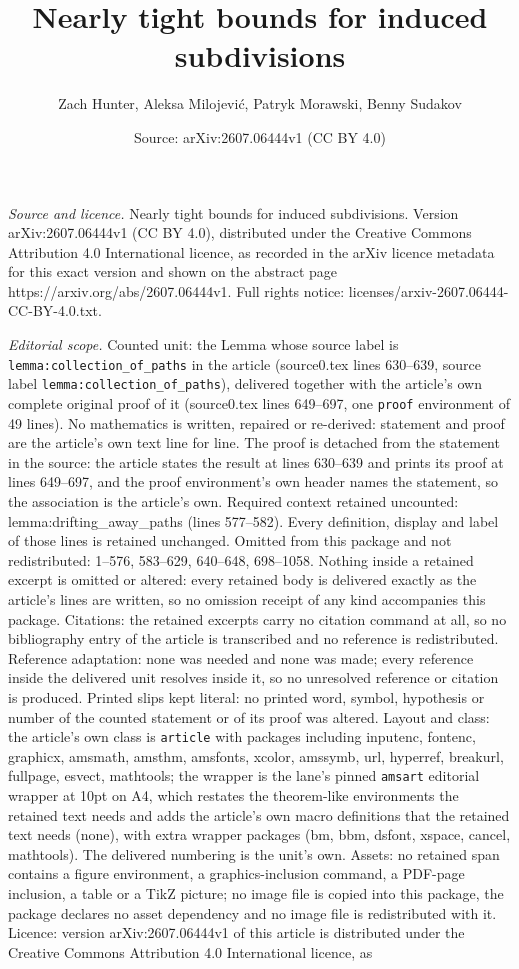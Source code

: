 \documentclass[10pt,a4paper]{amsart}
\title[Nearly tight bounds for induced subdivisions]{Nearly tight bounds for induced subdivisions}
\author{Zach Hunter, Aleksa Milojevi\'c, Patryk Morawski, Benny Sudakov}
\date{Source: arXiv:2607.06444v1 (CC BY 4.0)}
\begin{document}
\maketitle

\noindent\emph{Source and licence.} Nearly tight bounds for induced subdivisions. Version arXiv:2607.06444v1 (CC BY 4.0), distributed under the Creative Commons Attribution 4.0 International licence, as recorded in the arXiv licence metadata for this exact version and shown on the abstract page https://arxiv.org/abs/2607.06444v1. Full rights notice: licenses/arxiv-2607.06444-CC-BY-4.0.txt.\par\smallskip

\noindent\textit{Editorial scope.} Counted unit: the Lemma whose source label is \texttt{lemma:collection\_of\_paths} in the article (source0.tex lines 630--639, source label \texttt{lemma:collection\_of\_paths}), delivered together with the article's own complete original proof of it (source0.tex lines 649--697, one \texttt{proof} environment of 49 lines). No mathematics is written, repaired or re-derived: statement and proof are the article's own text line for line. The proof is detached from the statement in the source: the article states the result at lines 630--639 and prints its proof at lines 649--697, and the proof environment's own header names the statement, so the association is the article's own. Required context retained uncounted: lemma:drifting\_away\_paths (lines 577--582). Every definition, display and label of those lines is retained unchanged. Omitted from this package and not redistributed: 1--576, 583--629, 640--648, 698--1058. Nothing inside a retained excerpt is omitted or altered: every retained body is delivered exactly as the article's lines are written, so no omission receipt of any kind accompanies this package. Citations: the retained excerpts carry no citation command at all, so no bibliography entry of the article is transcribed and no reference is redistributed. Reference adaptation: none was needed and none was made; every reference inside the delivered unit resolves inside it, so no unresolved reference or citation is produced. Printed slips kept literal: no printed word, symbol, hypothesis or number of the counted statement or of its proof was altered. Layout and class: the article's own class is \texttt{article} with packages including inputenc, fontenc, graphicx, amsmath, amsthm, amsfonts, xcolor, amssymb, url, hyperref, breakurl, fullpage, esvect, mathtools; the wrapper is the lane's pinned \texttt{amsart} editorial wrapper at 10pt on A4, which restates the theorem-like environments the retained text needs and adds the article's own macro definitions that the retained text needs (none), with extra wrapper packages (bm, bbm, dsfont, xspace, cancel, mathtools). The delivered numbering is the unit's own. Assets: no retained span contains a figure environment, a graphics-inclusion command, a PDF-page inclusion, a table or a TikZ picture; no image file is copied into this package, the package declares no asset dependency and no image file is redistributed with it. Licence: version arXiv:2607.06444v1 of this article is distributed under the Creative Commons Attribution 4.0 International licence, as 
\end{document}
